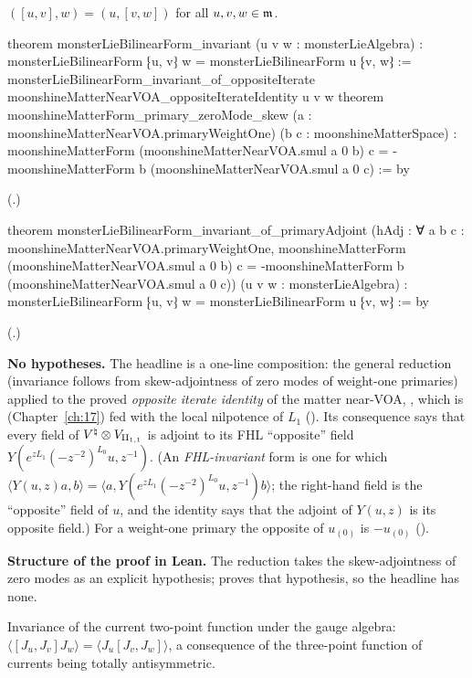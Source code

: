 \begin{theorem}\label{ch18:thm:invariance}
$([u,v],w)=(u,[v,w])$ for all $u,v,w\in\mathfrak{m}$.
\end{theorem}
\begin{leancode}
theorem monsterLieBilinearForm_invariant (u v w : monsterLieAlgebra) :
    monsterLieBilinearForm ⁅u, v⁆ w = monsterLieBilinearForm u ⁅v, w⁆ :=
  monsterLieBilinearForm_invariant_of_oppositeIterate
    moonshineMatterNearVOA_oppositeIterateIdentity u v w
theorem moonshineMatterForm_primary_zeroMode_skew
    (a : moonshineMatterNearVOA.primaryWeightOne) (b c : moonshineMatterSpace) :
    moonshineMatterForm (moonshineMatterNearVOA.smul a 0 b) c =
      -moonshineMatterForm b (moonshineMatterNearVOA.smul a 0 c) := by
\end{leancode}
(.)
\begin{leancode}
theorem monsterLieBilinearForm_invariant_of_primaryAdjoint
    (hAdj : ∀ a b c : moonshineMatterNearVOA.primaryWeightOne,
      moonshineMatterForm (moonshineMatterNearVOA.smul a 0 b) c =
        -moonshineMatterForm b (moonshineMatterNearVOA.smul a 0 c))
    (u v w : monsterLieAlgebra) :
    monsterLieBilinearForm ⁅u, v⁆ w = monsterLieBilinearForm u ⁅v, w⁆ := by
\end{leancode}
(.)
\begin{dictionary}
\textbf{No hypotheses.}  The headline is a one-line composition: the general reduction (invariance follows
from skew-adjointness of zero modes of weight-one primaries) applied to the proved \emph{opposite iterate
identity} of the matter near-VOA, , which is
 (Chapter~\ref{ch:17}) fed with the local nilpotence of
$L_1$ ().  Its consequence
 says that every field of ${V^{\natural}}\otimes V_{\mathrm{II}_{1,1}}$ is adjoint to its FHL
``opposite'' field $Y(e^{zL_1}(-z^{-2})^{L_0}u,z^{-1})$.  (An \emph{FHL-invariant} form is one for which $\langle Y(u,z)a,b\rangle=
\langle a,Y(e^{zL_1}(-z^{-2})^{L_0}u,z^{-1})b\rangle$; the right-hand field is the ``opposite'' field of $u$, and the identity says that
the adjoint of $Y(u,z)$ is its opposite field.)  For a weight-one primary the opposite of $u_{(0)}$ is $-u_{(0)}$
().

\textbf{Structure of the proof in Lean.}  The reduction  takes the
skew-adjointness of zero modes as an explicit hypothesis;  proves that hypothesis,
so the headline has none.
\end{dictionary}
\begin{physics}
Invariance of the current two-point function under the gauge algebra: $\langle[J_u,J_v]J_w\rangle=\langle J_u[J_v,J_w]\rangle$, a
consequence of the three-point function of currents being totally antisymmetric.
\end{physics}
